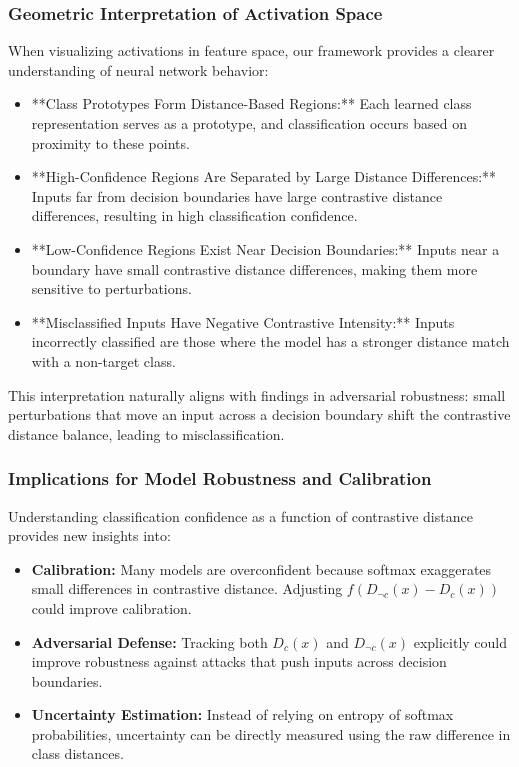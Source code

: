 \subsubsection{Geometric Interpretation of Activation Space}

When visualizing activations in feature space, our framework provides a clearer understanding of neural network behavior:

\begin{itemize}
    \item **Class Prototypes Form Distance-Based Regions:** Each learned class representation serves as a prototype, and classification occurs based on proximity to these points.
    \item **High-Confidence Regions Are Separated by Large Distance Differences:** Inputs far from decision boundaries have large contrastive distance differences, resulting in high classification confidence.
    \item **Low-Confidence Regions Exist Near Decision Boundaries:** Inputs near a boundary have small contrastive distance differences, making them more sensitive to perturbations.
    \item **Misclassified Inputs Have Negative Contrastive Intensity:** Inputs incorrectly classified are those where the model has a stronger distance match with a non-target class.
\end{itemize}

This interpretation naturally aligns with findings in adversarial robustness: small perturbations that move an input across a decision boundary shift the contrastive distance balance, leading to misclassification.

\subsubsection{Implications for Model Robustness and Calibration}

Understanding classification confidence as a function of contrastive distance provides new insights into:

\begin{itemize}
    \item \textbf{Calibration:} Many models are overconfident because softmax exaggerates small differences in contrastive distance. Adjusting \( f(D_{\neg c}(x) - D_c(x)) \) could improve calibration.
    \item \textbf{Adversarial Defense:} Tracking both \( D_c(x) \) and \( D_{\neg c}(x) \) explicitly could improve robustness against attacks that push inputs across decision boundaries.
    \item \textbf{Uncertainty Estimation:} Instead of relying on entropy of softmax probabilities, uncertainty can be directly measured using the raw difference in class distances.
\end{itemize}

